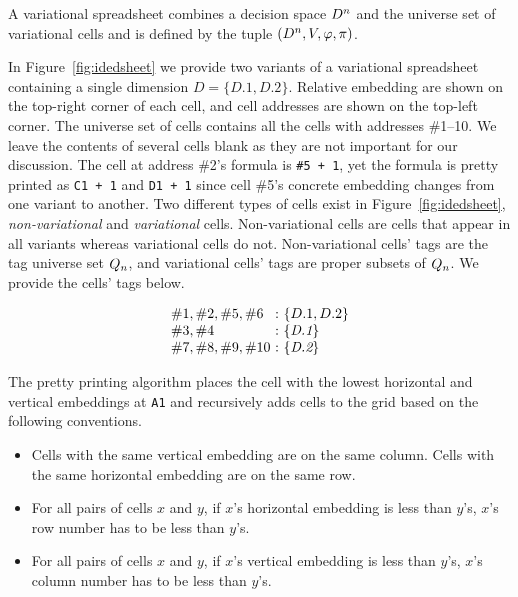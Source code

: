 \documentclass[conference]{IEEEtran}
\def\OB#1{\ifmmode#1\else\mbox{$#1$}\fi}
\newcommand{\set}[1]{\ensuremath{\{#1\}}}
\newcommand{\prog}[1]{{\small\texttt{#1}}}
\newcommand{\dimset}[1][D]{\OB{#1^n}}
\newcommand{\decstr}{\OB{{\cal D}}}
\newcommand{\qt}[1][\decstr]{\OB{Q_{#1}}}
\newcommand{\mapname}[1]{\textit{#1}}
\newcommand{\dset}[1]{\{#1\}}
\newcommand{\gcell}[1]{\##1}
\newcommand{\posSym}{\OB{\pi}}
\newcommand{\varSym}{\OB{V}}
\newcommand{\fmlSym}{\OB{\varphi}}
\begin{document}
A variational spreadsheet combines a decision space $\dimset$ and the universe set of variational cells and is defined by the tuple $(\dimset, \varSym, \fmlSym, \posSym)$.

In Figure~\ref{fig:idedsheet} we provide two variants of a variational spreadsheet containing a single dimension $\mapname{D} = \set{D.1, D.2}$.
Relative embedding are shown on the top-right corner of each cell, and cell addresses are shown on the top-left corner.
The universe set of cells contains all the cells with addresses \gcell{1--10}.
We leave the contents of several cells blank as they are not important for our discussion.
The cell at address \gcell{2}'s formula is \prog{\#5 + 1}, yet the formula is pretty printed as \prog{C1 + 1} and
\prog{D1 + 1} since cell \gcell{5}'s concrete embedding changes from one variant to another. 
Two different types of cells exist in Figure~\ref{fig:idedsheet}, \emph{non-variational} and \emph{variational} cells.
Non-variational cells are cells that appear in all variants whereas variational cells do not. 
Non-variational cells' tags are the tag universe set $\qt[n]$, and variational cells' tags are proper subsets of $\qt[n]$.
We provide the cells' tags below.

\[
\begin{array}{l@{\ : \ }l}
    \gcell{1}, \gcell{2}, \gcell{5}, \gcell{6} & \set{D.1, D.2} \\
    \gcell{3}, \gcell{4} & \dset{\mapname{D.1}} \\
    \gcell{7}, \gcell{8}, \gcell{9}, \gcell{10} & \dset{\mapname{D.2}} \\
\end{array}
\]

The pretty printing algorithm places the cell with the lowest horizontal and vertical embeddings at \prog{A1} and recursively adds cells to the grid based on the following conventions.

\begin{itemize}
    \item Cells with the same vertical embedding are on the same column. Cells with the same horizontal embedding are on the same row.
    \item For all pairs of cells $x$ and $y$, if $x$'s horizontal embedding is less than $y$'s, $x$'s row number has to be less than $y$'s.
    \item For all pairs of cells $x$ and $y$, if $x$'s vertical embedding is less than $y$'s, $x$'s column number has to be less than $y$'s.
\end{itemize}
\end{document}
